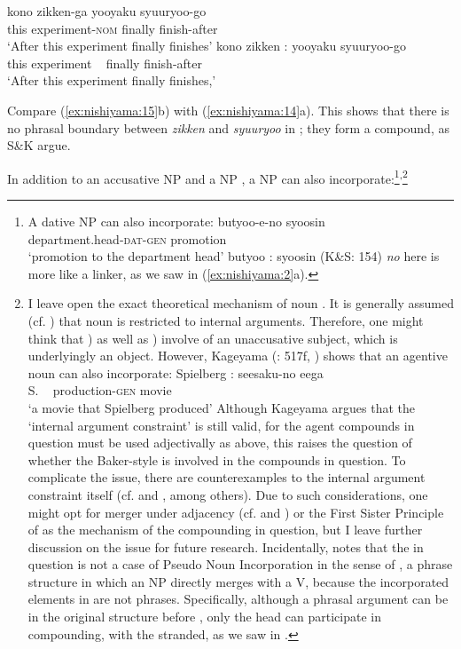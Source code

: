 \documentclass[output=paper]{LSP/langsci}
\begin{document}
\ea\label{ex:nishiyama:15}
\ea 
\gll kono zikken-ga     yooyaku  syuuryoo-go\\
    this experiment-\textsc{nom}  finally  finish-after\\
\glt ‘After this experiment finally finishes’
  \ex 
  \gll *kono zikken :  yooyaku syuuryoo-go\\
    this experiment  ~ finally finish-after\\
\glt ‘After this experiment finally finishes,’
\z\z

Compare (\ref{ex:nishiyama:15}b) with (\ref{ex:nishiyama:14}a). This shows that there is no phrasal boundary between \textit{zikken} and \textit{syuuryoo} in ; they form a compound, as S\&K argue.

In addition to an accusative NP  and a  NP , a  NP can also incorporate:\footnote{A dative NP can also incorporate:  
\ea
\gll  butyoo-e-no            syoosin\\ 
   department.head-\textsc{dat}-\textsc{gen}  promotion\\
\glt ‘promotion to the department head’  
\ex  butyoo : syoosin    (K\&S: 154)
\z
\textit{no} here is more like a linker, as we saw in (\ref{ex:nishiyama:2}a).}\textsuperscript{,}\footnote{I leave open the exact theoretical mechanism of noun . It is generally assumed (cf. \citealt{Baker1988}) that noun  is restricted to internal arguments. Therefore, one might think that ) as well as ) involve  of an unaccusative subject, which is underlyingly an object. However, Kageyama (\citeyear{Kageyama2009}: 517f, \citeyear{Kageyama2013}) shows that an agentive noun can also incorporate:  
\ea
\gll  Spielberg : seesaku-no     eega\\ 
   S.    ~  production-\textsc{gen}  movie\\
\glt `a movie that Spielberg produced’
\z
Although Kageyama argues that the ‘internal argument constraint’ is still valid, for the agent compounds in question must be used adjectivally as above, this raises the question of whether the Baker-style  is involved in the compounds in question. To complicate the issue, there are counterexamples to the internal argument constraint itself (cf. \citealt{Mithun2010} and \citealt{Lieber2010}, among others). Due to such considerations, one might opt for merger under adjacency (cf. \citealt{Marantz1988} and  \citealt{HalleMarantz1993}) or the First Sister Principle of    \citet{RoeperSiegel1978} as the mechanism of the compounding in question, but I leave further discussion on the issue for future research.  Incidentally, \citet[525]{Kageyama2009} notes that the  in question is not a case of Pseudo Noun Incorporation in the sense of \citet{Massam2001}, a phrase structure in which an NP directly merges with a V, because the incorporated elements in  are not phrases. Specifically, although a phrasal argument can be in the original structure before , only the head can participate in compounding, with the  stranded, as we saw in .}
\end{document}
